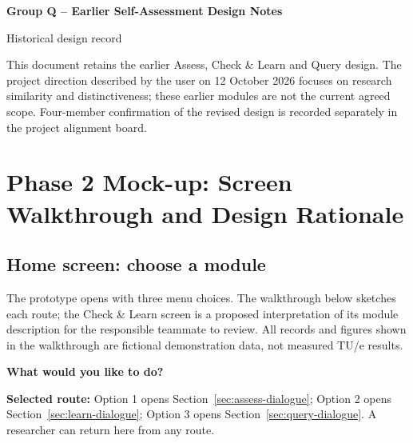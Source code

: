\documentclass[11pt,a4paper]{article}
\begin{document}
\begin{center}
{\Large\bfseries Group Q -- Earlier Self-Assessment Design Notes\par}
\medskip
{\large Historical design record\par}
\end{center}
\noindent This document retains the earlier Assess, Check \& Learn and Query design. The project direction described by the user on 12 October 2026 focuses on research similarity and distinctiveness; these earlier modules are not the current agreed scope. Four-member confirmation of the revised design is recorded separately in the project alignment board.

\clearpage
\section{Phase 2 Mock-up: Screen Walkthrough and Design Rationale}
\label{sec:phase2-mockup}

\subsection{Home screen: choose a module}
\label{sec:phase2-home}
The prototype opens with three menu choices. The walkthrough below sketches each route; the Check \& Learn screen is a proposed interpretation of its module description for the responsible teammate to review. All records and figures shown in the walkthrough are fictional demonstration data, not measured TU/e results.

\begin{tcolorbox}[colback=gray!3,colframe=black!55,title={Home --- AI for a Greener Research Future},breakable]
\textbf{What would you like to do?}\par\medskip
{}\quad
{}\quad
{}\par\medskip
\textbf{Selected route:} Option 1 opens Section~\ref{sec:assess-dialogue}; Option 2 opens Section~\ref{sec:learn-dialogue}; Option 3 opens Section~\ref{sec:query-dialogue}. A researcher can return here from any route.
\end{tcolorbox}


\end{document}
